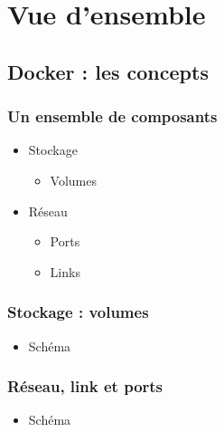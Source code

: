   \section[Docker]{Vue d'ensemble}

  \subsection[Docker]{Docker : les concepts}

  \begin{frame}
    \frametitle{Un ensemble de composants}
    \begin{itemize}
      \item Stockage\pause
      \begin{itemize}
          \item Volumes \pause
      \end{itemize}
      \item Réseau \pause
      \begin{itemize}
          \item Ports \pause
          \item Links \pause
      \end{itemize}
    \end{itemize}
  \end{frame}

  \begin{frame}
    \frametitle{Stockage : volumes}
    \begin{itemize}
      \item Schéma
    \end{itemize}
  \end{frame}

  \begin{frame}
    \frametitle{Réseau, link et ports}
    \begin{itemize}
      \item Schéma
    \end{itemize}
  \end{frame}
